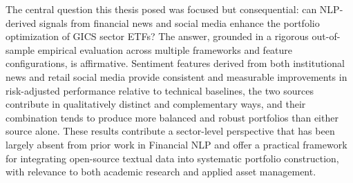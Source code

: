 The central question this thesis posed was focused but consequential: can NLP-derived signals from financial news and social media enhance the portfolio optimization of GICS sector ETFs? The answer, grounded in a rigorous out-of-sample empirical evaluation across multiple frameworks and feature configurations, is affirmative. Sentiment features derived from both institutional news and retail social media provide consistent and measurable improvements in risk-adjusted performance relative to technical baselines, the two sources contribute in qualitatively distinct and complementary ways, and their combination tends to produce more balanced and robust portfolios than either source alone. These results contribute a sector-level perspective that has been largely absent from prior work in Financial NLP and offer a practical framework for integrating open-source textual data into systematic portfolio construction, with relevance to both academic research and applied asset management.

